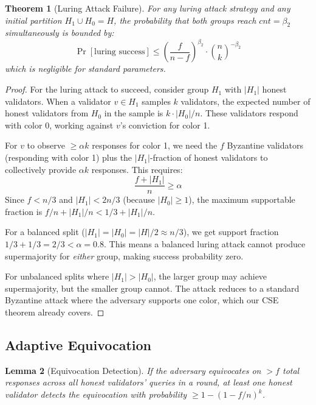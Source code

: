 \documentclass[11pt,a4paper]{article}
\newtheorem{theorem}{Theorem}[section]
\newtheorem{lemma}[theorem]{Lemma}
\begin{document}
\begin{theorem}[Luring Attack Failure]
\label{thm:luring}
For any luring attack strategy and any initial partition $H_1 \cup H_0 = H$, the
probability that both groups reach $cnt = \beta_2$ simultaneously is bounded by:
\[
\Pr[\text{luring success}] \leq \left(\frac{f}{n - f}\right)^{\beta_2} \cdot \binom{n}{k}^{-\beta_2}
\]
which is negligible for standard parameters.
\end{theorem}

\begin{proof}
For the luring attack to succeed, consider group $H_1$ with $|H_1|$ honest validators.
When a validator $v \in H_1$ samples $k$ validators, the expected number of honest
validators from $H_0$ in the sample is $k \cdot |H_0|/n$. These validators respond with
color 0, working against $v$'s conviction for color 1.

For $v$ to observe $\geq \alpha k$ responses for color 1, we need the $f$ Byzantine
validators (responding with color 1) plus the $|H_1|$-fraction of honest validators
to collectively provide $\alpha k$ responses. This requires:
\[
\frac{f + |H_1|}{n} \geq \alpha
\]
Since $f < n/3$ and $|H_1| < 2n/3$ (because $|H_0| \geq 1$), the maximum supportable
fraction is $f/n + |H_1|/n < 1/3 + |H_1|/n$.

For a balanced split ($|H_1| = |H_0| = |H|/2 \approx n/3$), we get support fraction
$1/3 + 1/3 = 2/3 < \alpha = 0.8$. This means a balanced luring attack cannot produce
supermajority for \emph{either} group, making success probability zero.

For unbalanced splits where $|H_1| > |H_0|$, the larger group may achieve supermajority,
but the smaller group cannot. The attack reduces to a standard Byzantine attack where
the adversary supports one color, which our CSE theorem already covers.
\end{proof}

\subsection{Adaptive Equivocation}

\begin{lemma}[Equivocation Detection]
\label{lem:equivocation}
If the adversary equivocates on $> f$ total responses across all honest validators'
queries in a round, at least one honest validator detects the equivocation with
probability $\geq 1 - (1 - f/n)^k$.
\end{lemma}
\end{document}
